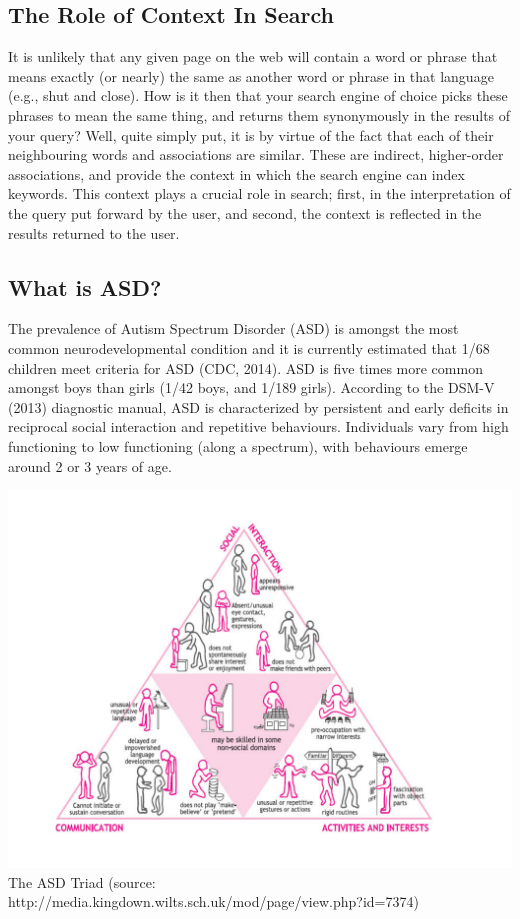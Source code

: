 \documentclass[10pt]{article}
\begin{document}
\subsection{The Role of Context In Search}
It is unlikely that any given page on the web will contain a word or phrase that means exactly (or nearly) the same as another word or phrase in that language (e.g., shut and close). How is it then that your search engine of choice picks these phrases to mean the same thing, and returns them synonymously in the results of your query? Well, quite simply put, it is by virtue of the fact that each of their neighbouring words and associations are similar. These are indirect, higher-order associations, and provide the context in which the search engine can index keywords. This context plays a crucial role in search; first, in the interpretation of the query put forward by the user, and second, the context is reflected in the results returned to the user.

\subsection{What is ASD?}
The prevalence of Autism Spectrum Disorder (ASD) is amongst the most common neurodevelopmental condition and it is currently estimated that 1/68 children meet criteria for ASD (CDC, 2014). ASD is five times more common amongst boys than girls (1/42 boys, and 1/189 girls). According to the DSM-V (2013) diagnostic manual, ASD is characterized by persistent and early deficits in reciprocal social interaction and repetitive behaviours. Individuals vary from high functioning to low functioning (along a spectrum), with behaviours emerge around 2 or 3 years of age. 

\begin{center}
\includegraphics[scale=0.5]{asd}\\
The ASD Triad (source: http://media.kingdown.wilts.sch.uk/mod/page/view.php?id=7374)
\end{center}
\end{document}
